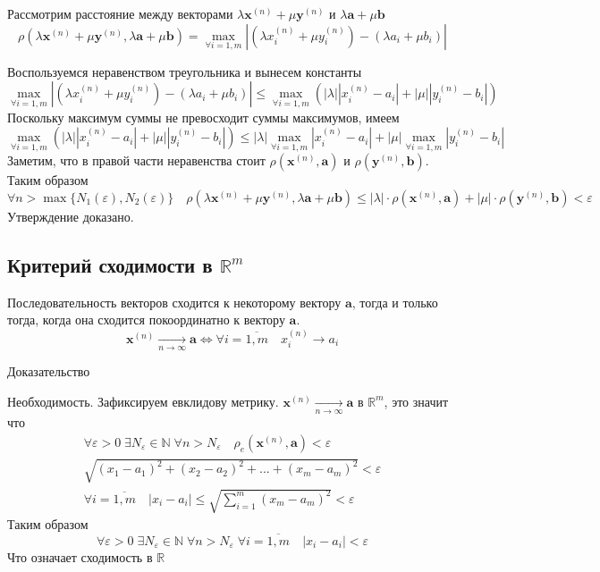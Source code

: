 \begin{enumerate}
  Рассмотрим расстояние между векторами $ \lambda \textbf {x}^{(n)} + \mu \textbf {y}^{(n)}$ и $\lambda \textbf {a} + \mu \textbf {b}$
  $$
  \rho(\lambda \textbf {x}^{(n)} + \mu \textbf {y}^{(n)}, \lambda \textbf {a} + \mu \textbf {b}) = \underset{\forall i=1, m}{\max}{|(\lambda {x}^{(n)}_i + \mu {y}^{(n)}_i) - (\lambda {a}_i + \mu  {b}_i)|}
  $$
  
  Воспользуемся неравенством треугольника и вынесем константы
  $$
  \underset{\forall i=1, m}{\max}{|(\lambda {x}^{(n)}_i + \mu {y}^{(n)}_i) - (\lambda {a}_i + \mu {b}_i)|} \leq \underset{\forall i=1, m}{\max}{(|\lambda| |{x}^{(n)}_i - {a}_i| + |\mu| |{y}^{(n)}_i - {b}_i|)}
  $$
  Поскольку максимум суммы не превосходит суммы максимумов, имеем
  $$
  \underset{\forall i=1, m}{\max}{(|\lambda| |{x}^{(n)}_i - {a}_i| + |\mu| |{y}^{(n)}_i - {b}_i|)} \leq |\lambda| \underset{\forall i=1, m}{\max}{|{x}^{(n)}_i - {a}_i|} + |\mu| \underset{\forall i=1, m}{\max}{|{y}^{(n)}_i - {b}_i|}
  $$
  Заметим, что в правой части неравенства стоит $\rho(\textbf {x}^{(n)}, \textbf {a})$ и $\rho(\textbf {y}^{(n)}, \textbf {b} )$. Таким образом
  $$
  \forall n > \max\{N_1(\varepsilon), N_2(\varepsilon)\} \quad \rho(\lambda \textbf {x}^{(n)} + \mu \textbf {y}^{(n)}, \lambda \textbf {a} + \mu \textbf {b}) \leq |\lambda| \cdot \rho(\textbf {x}^{(n)}, \textbf {a} ) + |\mu| \cdot \rho(\textbf {y}^{(n)}, \textbf {b} ) < \varepsilon
  $$
  Утверждение доказано.
  \subsection{Критерий сходимости в $\mathbb {R}^m$}
  
  Последовательность векторов сходится к некоторому вектору $\textbf {a}$, тогда и только тогда, когда она сходится покоординатно к вектору $\textbf {a}$.
  $$
  \textbf {x}^{(n)}  \underset{n \to \infty}{\longrightarrow} \textbf {a} \Leftrightarrow \forall i = \overline{1,m} \quad x^{(n)}_i \longrightarrow a_i
  $$
  
  Доказательство
 
  Необходимость. Зафиксируем евклидову метрику. $\textbf {x}^{(n)}  \underset{n \to \infty}{\longrightarrow} \textbf {a}$ в $\mathbb {R}^m$, это значит что
  \begin{equation*}
  \begin{gathered}
  \forall \varepsilon > 0 \; \exists N_{\varepsilon} \in \mathbb {N} \; \forall n > N_{\varepsilon} \quad \rho_e(\textbf {x}^{(n)}, \textbf {a}) < \varepsilon\\
  \sqrt{(x_1 - a_1)^2 + (x_2 - a_2)^2 + ... + (x_m - a_m)^2} < \varepsilon\\
  \forall i = \overline{1,m} \quad |x_i - a_i| \leq \sqrt{\sum\limits_{i=1}^m (x_m - a_m)^2} < \varepsilon
  \end{gathered}
  \end{equation*}
  Таким образом
  $$
  \forall \varepsilon > 0 \; \exists N_{\varepsilon} \in \mathbb {N} \; \forall n > N_{\varepsilon} \; \forall i = \overline{1,m} \quad |x_i - a_i| < \varepsilon
  $$
  Что означает сходимость в $\mathbb {R}$
  

\end{enumerate}
